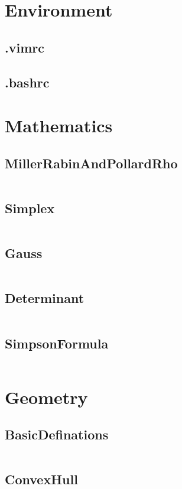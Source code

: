 \section{Environment}
  \subsection{.vimrc}
    
  \subsection{.bashrc}
    
\section{Mathematics}
  \subsection{MillerRabinAndPollardRho}
    \inputminted{cpp}{src/2_Mathematics/1_MillerRabinAndPollardRho.cpp}
  \subsection{Simplex}
    \inputminted{cpp}{src/2_Mathematics/2_Simplex.cpp}
  \subsection{Gauss}
    \inputminted{cpp}{src/2_Mathematics/3_Gauss.cpp}
  \subsection{Determinant}
    \inputminted{cpp}{src/2_Mathematics/4_Determinant.cpp}
  \subsection{SimpsonFormula}
    \inputminted{cpp}{src/2_Mathematics/5_SimpsonFormula.cpp}
\section{Geometry}
  \subsection{BasicDefinations}
    \inputminted{cpp}{src/3_Geometry/1_BasicDefinations.cpp}
  \subsection{ConvexHull}
    \inputminted{cpp}{src/3_Geometry/2_ConvexHull.cpp}

